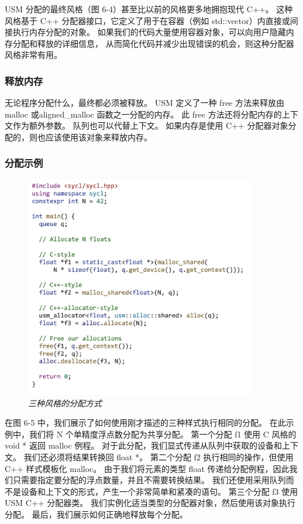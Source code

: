 USM 分配的最终风格（图 6-4）甚至比以前的风格更多地拥抱现代 C++。 
这种风格基于 C++ 分配器接口，它定义了用于在容器（例如 std::vector）内直接或间接执行内存分配的对象。 
如果我们的代码大量使用容器对象，可以向用户隐藏内存分配和释放的详细信息，
从而简化代码并减少出现错误的机会，则这种分配器风格非常有用。

\subsubsection{释放内存}
无论程序分配什么，最终都必须被释放。 
USM 定义了一种 free 方法来释放由 malloc 或aligned\_malloc 函数之一分配的内存。 
此 free 方法还将分配内存的上下文作为额外参数。 队列也可以代替上下文。 
如果内存是使用 C++ 分配器对象分配的，则也应该使用该对象来释放内存。

\subsubsection{分配示例}

\begin{figure}[H]
	\centering
	\includegraphics[width=0.9\textwidth]{figs/F6.5.png}
	\caption{\textit{三种风格的分配方式}}
\end{figure}

在图 6-5 中，我们展示了如何使用刚才描述的三种样式执行相同的分配。 
在此示例中，我们将 N 个单精度浮点数分配为共享分配。 第一个分配 f1 使用 C 风格的 void * 返回 malloc 例程。 
对于此分配，我们显式传递从队列中获取的设备和上下文。 我们还必须将结果转换回 float *。 
第二个分配 f2 执行相同的操作，但使用 C++ 样式模板化 malloc。 
由于我们将元素的类型 float 传递给分配例程，因此我们只需要指定要分配的浮点数量，并且不需要转换结果。 
我们还使用采用队列而不是设备和上下文的形式，产生一个非常简单和紧凑的语句。 
第三个分配 f3 使用 USM C++ 分配器类。 我们实例化适当类型的分配器对象，然后使用该对象执行分配。 
最后，我们展示如何正确地释放每个分配。

